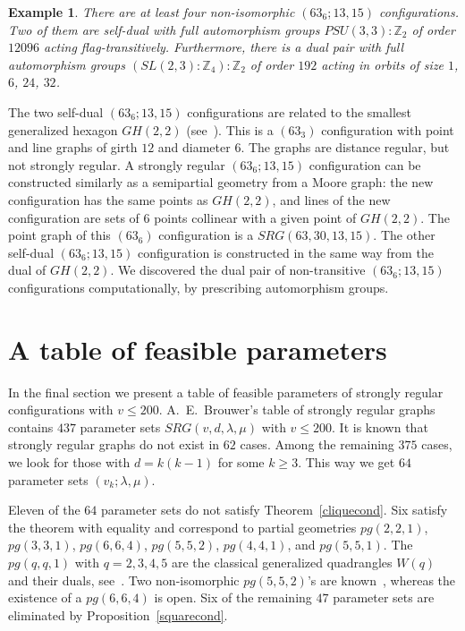 \documentclass[12pt, reqno]{amsart}
\newtheorem{example}[theorem]{Example}
\def\Z{\mathbb{Z}}
\begin{document}
\begin{example}\label{src63}
There are at least four non-isomorphic $(63_6;13,15)$
configurations. Two of them are self-dual
with full automorphism groups $PSU(3,3) : \Z_2$ of order
$12096$ acting flag-transitively. Furthermore, there is a dual pair
with full automorphism groups $(SL(2,3) : \Z_4) : \Z_2$ of
order $192$ acting in orbits of size $1$, $6$, $24$, $32$.
\end{example}

The two self-dual $(63_6;13,15)$ configurations are related to the
smallest generalized hexagon $GH(2,2)$ (see~\cite[Section 5.7]{GR01}).
This is a $(63_3)$ configuration  with point and line graphs of
girth $12$ and diameter $6$. The graphs are distance regular, but
not strongly regular. A strongly regular $(63_6;13,15)$ configuration
can be constructed similarly as a semipartial geometry
from a Moore graph: the new configuration has the same points as
$GH(2,2)$, and lines of the new configuration are sets of $6$ points
collinear with a given point of $GH(2,2)$. The point graph of this
$(63_6)$ configuration is a $SRG(63,30,13,15)$. The other self-dual
$(63_6;13,15)$ configuration is constructed in the same way from the
dual of $GH(2,2)$. We discovered the dual pair of non-transitive
$(63_6;13,15)$ configurations computationally, by prescribing
automorphism groups.


\section{A table of feasible parameters}\label{sec5}

In the final section we present a table of feasible parameters
of strongly regular configurations with $v\le 200$. A.~E.~Brouwer's
table of strongly regular graphs~\cite{AEB} contains $437$ parameter sets
$SRG(v,d,\lambda,\mu)$ with $v\le 200$. It is known that strongly regular
graphs do not exist in $62$ cases. Among the remaining $375$
cases, we look for those with $d=k(k-1)$ for some $k\ge 3$. This way
we get $64$ parameter sets $(v_k;\lambda,\mu)$.

Eleven of the $64$ parameter sets do not satisfy Theorem~\ref{cliquecond}.
Six satisfy the theorem with equality and correspond to
partial geometries $pg(2,2,1)$, $pg(3,3,1)$, $pg(6,6,4)$, $pg(5,5,2)$,
$pg(4,4,1)$, and $pg(5,5,1)$. The $pg(q,q,1)$ with $q=2,3,4,5$ are the classical generalized
quadrangles $W(q)$ and their duals, see~\cite{PT09}.
Two non-isomorphic $pg(5,5,2)$'s are known~\cite{vLS81, CST21, VK20b}, whereas
the existence of a $pg(6,6,4)$ is open. Six of the remaining $47$ parameter
sets are eliminated by Proposition~\ref{squarecond}.
\end{document}
